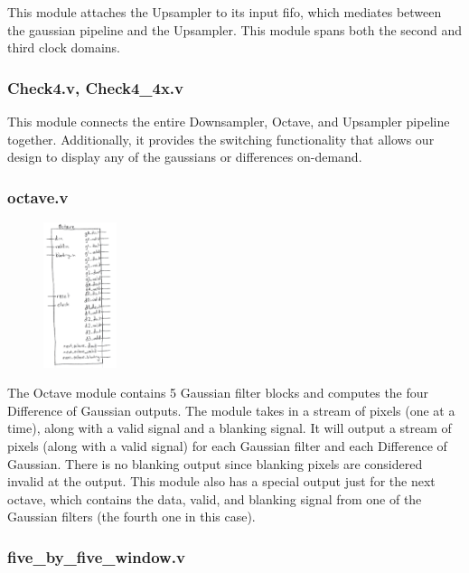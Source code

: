 \documentclass[12pt]{article}
\begin{document}
This module attaches the Upsampler to its input fifo, which mediates between
the gaussian pipeline and the Upsampler. This module spans both the second and
third clock domains.

\subsubsection{Check4.v, Check4\_4x.v}


This module connects the entire Downsampler, Octave, and Upsampler pipeline together.
Additionally, it provides the switching functionality that allows our design to 
display any of the gaussians or differences on-demand.

\subsubsection{octave.v}

\begin{figure}
    \includegraphics[width=0.19\textwidth]{processed_image_pngs/black_box_modules/Octave_blackbox.png}
\end{figure}

The Octave module contains 5 Gaussian filter blocks and computes the four 
Difference of Gaussian outputs. The module takes in a stream of pixels (one at 
a time), along with a valid signal and a blanking signal. It will output a 
stream of pixels (along with a valid signal) for each Gaussian filter and each 
Difference of Gaussian. There is no blanking output since blanking pixels are 
considered invalid at the output. This module also has a special output just 
for the next octave, which contains the data, valid, and blanking signal from 
one of the Gaussian filters (the fourth one in this case).

\subsubsection{five\_by\_five\_window.v}
\end{document}
